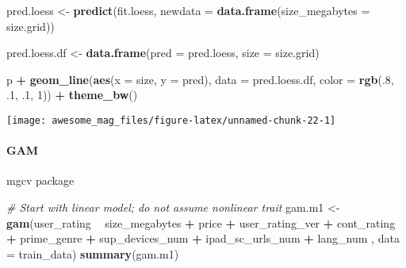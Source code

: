 \documentclass[]{article}
\newenvironment{Shaded}{\begin{snugshade}}{\end{snugshade}}
\newcommand{\KeywordTok}[1]{\textcolor[rgb]{0.13,0.29,0.53}{\textbf{#1}}}
\newcommand{\DataTypeTok}[1]{\textcolor[rgb]{0.13,0.29,0.53}{#1}}
\newcommand{\DecValTok}[1]{\textcolor[rgb]{0.00,0.00,0.81}{#1}}
\newcommand{\StringTok}[1]{\textcolor[rgb]{0.31,0.60,0.02}{#1}}
\newcommand{\CommentTok}[1]{\textcolor[rgb]{0.56,0.35,0.01}{\textit{#1}}}
\newcommand{\OperatorTok}[1]{\textcolor[rgb]{0.81,0.36,0.00}{\textbf{#1}}}
\newcommand{\NormalTok}[1]{#1}
\let\oldparagraph\paragraph
\renewcommand{\paragraph}[1]{\oldparagraph{#1}\mbox{}}
\begin{document}
\begin{Shaded}
\begin{Highlighting}[]
\NormalTok{pred.loess <-}\StringTok{ }\KeywordTok{predict}\NormalTok{(fit.loess, }\DataTypeTok{newdata =} \KeywordTok{data.frame}\NormalTok{(}\DataTypeTok{size_megabytes =}\NormalTok{ size.grid))}

\NormalTok{pred.loess.df <-}\StringTok{ }\KeywordTok{data.frame}\NormalTok{(}\DataTypeTok{pred =}\NormalTok{ pred.loess,}
                            \DataTypeTok{size =}\NormalTok{ size.grid)}

\NormalTok{p }\OperatorTok{+}\StringTok{ }\KeywordTok{geom_line}\NormalTok{(}\KeywordTok{aes}\NormalTok{(}\DataTypeTok{x =}\NormalTok{ size, }\DataTypeTok{y =}\NormalTok{ pred), }\DataTypeTok{data =}\NormalTok{ pred.loess.df,}
              \DataTypeTok{color =} \KeywordTok{rgb}\NormalTok{(.}\DecValTok{8}\NormalTok{, .}\DecValTok{1}\NormalTok{, .}\DecValTok{1}\NormalTok{, }\DecValTok{1}\NormalTok{)) }\OperatorTok{+}\StringTok{ }\KeywordTok{theme_bw}\NormalTok{()}
\end{Highlighting}
\end{Shaded}

\texttt{[image: awesome\_mag\_files/figure-latex/unnamed-chunk-22-1]}

\paragraph{GAM}\label{gam}

mgcv package

\begin{Shaded}
\begin{Highlighting}[]
\CommentTok{# Start with linear model; do not assume nonlinear trait}
\NormalTok{gam.m1 <-}\StringTok{ }\KeywordTok{gam}\NormalTok{(user_rating }\OperatorTok{~}\StringTok{ }\NormalTok{size_megabytes }\OperatorTok{+}\StringTok{ }\NormalTok{price }\OperatorTok{+}\StringTok{ }
\StringTok{                }\NormalTok{user_rating_ver }\OperatorTok{+}\StringTok{ }\NormalTok{cont_rating }\OperatorTok{+}\StringTok{ }\NormalTok{prime_genre }\OperatorTok{+}\StringTok{ }\NormalTok{sup_devices_num }\OperatorTok{+}
\StringTok{                }\NormalTok{ipad_sc_urls_num }\OperatorTok{+}\StringTok{ }\NormalTok{lang_num , }\DataTypeTok{data =}\NormalTok{ train_data) }
\KeywordTok{summary}\NormalTok{(gam.m1)}
\end{Highlighting}
\end{Shaded}
\end{document}
